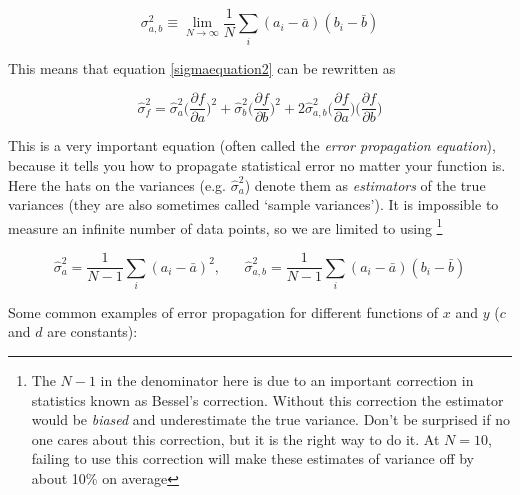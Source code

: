 \begin{equation}
\sigma_{a,b}^2 \equiv \lim_{N \to \infty}  \frac{1}{N} \sum_i (a_i - \bar a)(b_i - \bar b)
\end{equation}

This means that equation \ref{sigmaequation2} can be rewritten as
\begin{framed}
\begin{equation}\label{errprop}
\hat \sigma_f^2 = \hat  \sigma_a^2 \bigg ( \frac{\partial f}{\partial a}\bigg )^2 + \hat \sigma_b^2 \bigg ( \frac{\partial f}{\partial b}\bigg )^2  + 2 \hat \sigma_{a,b}^2\bigg ( \frac{\partial f}{\partial a}\bigg )  \bigg ( \frac{\partial f}{\partial b}\bigg )
\end{equation}
\end{framed}

This is a very important equation (often called the \emph{error propagation equation}), because it tells you how to propagate statistical error no matter your function is. Here the hats on the variances (e.g. $\hat \sigma_a^2$) denote them as {\it estimators} of the true variances (they are also sometimes called `sample variances'). It is impossible to measure an infinite number of data points, so we are limited to using \footnote{The $N-1$ in the denominator here is due to an important correction in statistics known as Bessel's correction. Without this correction the  estimator would be \emph{biased} and underestimate the true variance. Don't be surprised if no one cares about this correction, but it is the right way to do it. At $N = 10$, failing to use this correction will make these estimates of variance off by about 10\% on average}

\begin{equation}\label{bessel}
\hat \sigma_a^2 =  \frac{1}{N-1} \sum_i (a_i - \bar a)^2, \; \; \; \; \; \; \hat \sigma_{a,b}^2  = \frac{1}{N-1} \sum_i (a_i - \bar a)(b_i - \bar b)
\end{equation}

Some common examples of error propagation for different functions of $x$ and $y$ ($c$ and $d$ are constants):


